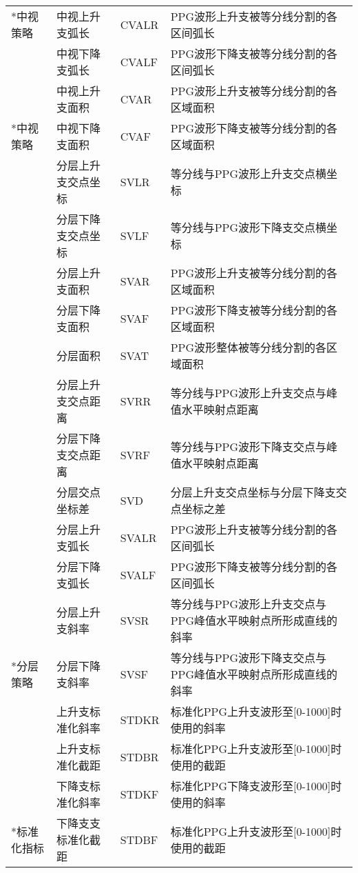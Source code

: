 \begin{center}
\begin{longtable}{m{1.5cm}<{\centering}m{3.5cm}<{\centering}m{2cm}<{\centering}m{8cm}<{\centering}}
         \multirow{-9}*{中视策略} &     中视上升支弧长 & CVALR & PPG波形上升支被等分线分割的各区间弧长 \\
         &     中视下降支弧长 & CVALF & PPG波形下降支被等分线分割的各区间弧长 \\
         &     中视上升支面积 & CVAR & PPG波形上升支被等分线分割的各区域面积 \\
         \multirow{-3}*{中视策略} &     中视下降支面积 & CVAF & PPG波形下降支被等分线分割的各区域面积 \\
         &     分层上升支交点坐标 & SVLR & 等分线与PPG波形上升支交点横坐标 \\
         &     分层下降支交点坐标 & SVLF & 等分线与PPG波形下降支交点横坐标 \\
         &     分层上升支面积 & SVAR & PPG波形上升支被等分线分割的各区域面积 \\
         &     分层下降支面积 & SVAF & PPG波形下降支被等分线分割的各区域面积 \\
         &     分层面积 & SVAT & PPG波形整体被等分线分割的各区域面积 \\
         &     分层上升支交点距离 & SVRR & 等分线与PPG波形上升支交点与峰值水平映射点距离 \\
         &     分层下降支交点距离 & SVRF & 等分线与PPG波形下降支交点与峰值水平映射点距离 \\
         &     分层交点坐标差 & SVD &  分层上升支交点坐标与分层下降支交点坐标之差\\
         &     分层上升支弧长 & SVALR & PPG波形上升支被等分线分割的各区间弧长 \\
         &     分层下降支弧长 & SVALF & PPG波形下降支被等分线分割的各区间弧长 \\
         &     分层上升支斜率 & SVSR & 等分线与PPG波形上升支交点与PPG峰值水平映射点所形成直线的斜率\\
         \multirow{-12}*{分层策略} & 分层下降支斜率 & SVSF & 等分线与PPG波形下降支交点与PPG峰值水平映射点所形成直线的斜率 \\
         &     上升支标准化斜率 & STDKR & 标准化PPG上升支波形至[0-1000]时使用的斜率 \\
         &     上升支标准化截距 & STDBR & 标准化PPG上升支波形至[0-1000]时使用的截距 \\
         &     下降支标准化斜率& STDKF & 标准化PPG下降支波形至[0-1000]时使用的斜率 \\
         \multirow{-4}*{标准化指标}   &  下降支支标准化截距 & STDBF & 标准化PPG上升支波形至[0-1000]时使用的截距 \\
  \end{longtable}
\end{center}

